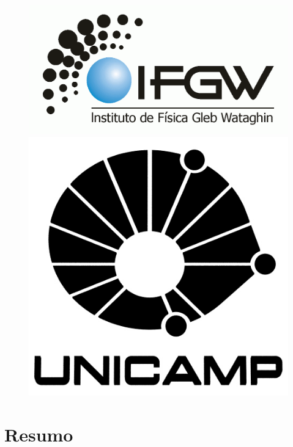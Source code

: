 \documentclass[a4paper]{article}
\begin{document}
	\begin{figure}[!ht]
		\begin{centering}
			\includegraphics[clip,scale=0.4]{logo-ifgw} 
		\par\end{centering}

		\vspace*{1cm}

		\centering{} 
			\includegraphics[clip,scale=0.3]{logo-unicamp-name-line-blk-blk-0480} 

	\end{figure}


	\newpage{}


	\section{Resumo}
\end{document}
